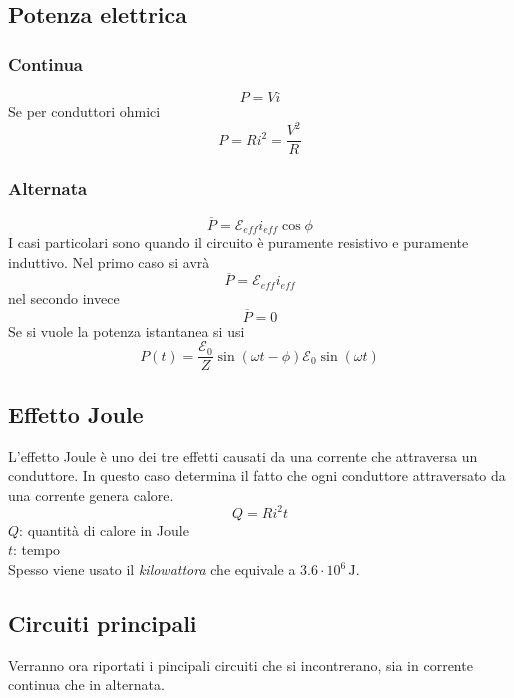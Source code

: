 \subsection{Potenza elettrica}
\subsubsection{Continua}
\begin{equation*}
P = Vi
\end{equation*}
Se per conduttori ohmici
\begin{equation*}
P = Ri^2 = \frac{V^2}{R}
\end{equation*}
\subsubsection{Alternata}
\begin{equation*}
  \overline{P} = \mathcal{E}_{eff}i_{eff}\cos\phi
\end{equation*}
I casi particolari sono quando il circuito è puramente resistivo e puramente induttivo. Nel primo
caso si avrà
\begin{equation*}
  \overline{P} = \mathcal{E}_{eff}i_{eff}
\end{equation*}
nel secondo invece
\begin{equation*}
  \overline{P} = 0
\end{equation*}
Se si vuole la potenza istantanea si usi
\begin{equation*}
  P(t) = \frac{\mathcal{E}_0}{Z}\sin(\omega t - \phi) \mathcal{E}_0\sin(\omega t) 
\end{equation*}

\subsection{Effetto Joule}
L'effetto Joule è uno dei tre effetti causati da una corrente che attraversa un conduttore. 
In questo caso determina il fatto che ogni conduttore attraversato da una corrente genera calore.
\begin{equation*}
Q = Ri^2t
\end{equation*}
$Q$: quantità di calore in Joule\\
$t$: tempo\\ [\baselineskip]

Spesso viene usato il \emph{kilowattora} che equivale a $3.6\cdot10^6\,\text{J}$.

\subsection{Circuiti principali}
Verranno ora riportati i pincipali circuiti che si incontrerano, sia in corrente continua che in
alternata.

